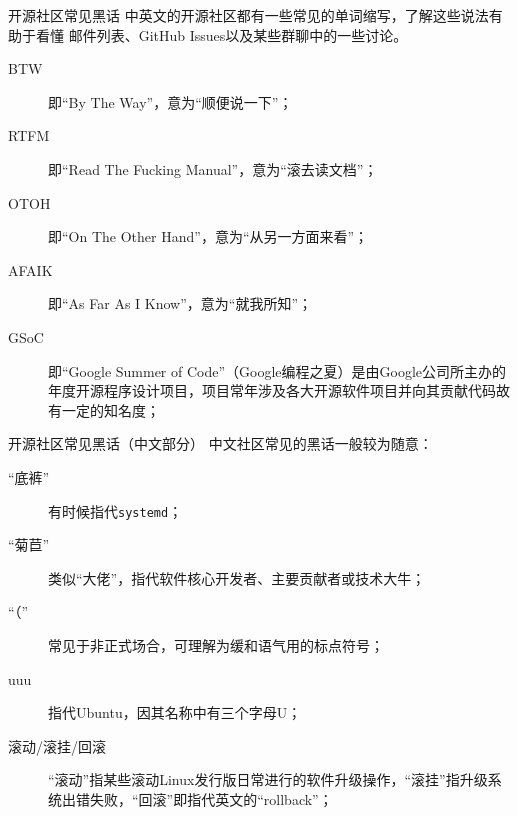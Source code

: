 \begin{frame}{开源社区常见黑话}
	中英文的开源社区都有一些常见的单词缩写，了解这些说法有助于看懂
	邮件列表、GitHub Issues以及某些群聊中的一些讨论。
	\begin{description}
		\item[BTW] 即“By The Way”，意为“顺便说一下”；
		\item[RTFM] 即“Read The Fucking Manual”，意为“滚去读文档”；
		\item[OTOH] 即“On The Other Hand”，意为“从另一方面来看”；
		\item[AFAIK] 即“As Far As I Know”，意为“就我所知”；
		\item[GSoC] 即“Google Summer of Code”（Google编程之夏）是由Google公司所主办的年度开源程序设计项目，项目常年涉及各大开源软件项目并向其贡献代码故有一定的知名度；
		
		
	\end{description}
\end{frame}

\begin{frame}{开源社区常见黑话（中文部分）}
	中文社区常见的黑话一般较为随意：
	\begin{description}
		\item[“底裤”] 有时候指代\texttt{systemd}；
		\item[“菊苣”] 类似“大佬”，指代软件核心开发者、主要贡献者或技术大牛；
		\item[“（”] 常见于非正式场合，可理解为缓和语气用的标点符号；
		\item[uuu] 指代Ubuntu，因其名称中有三个字母U；
		\item[滚动/滚挂/回滚] “滚动”指某些滚动Linux发行版日常进行的软件升级操作，“滚挂”指升级系统出错失败，“回滚”即指代英文的“rollback”；
		
	\end{description}
\end{frame}
